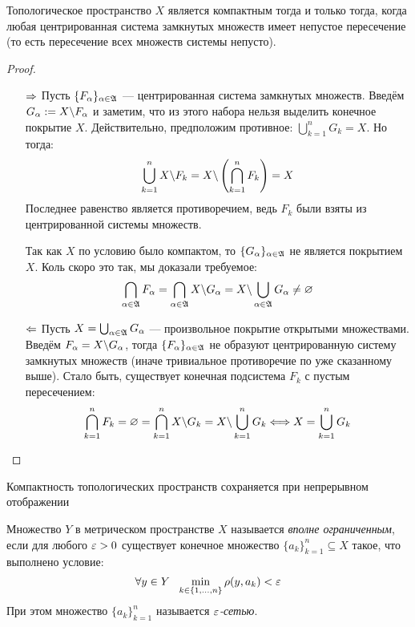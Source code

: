 \begin{theorem}
	Топологическое пространство $X$ является компактным тогда и только тогда, когда любая центрированная система замкнутых множеств имеет непустое пересечение (то есть пересечение всех множеств системы непусто).
\end{theorem}

\begin{proof}~
	\begin{itemize}
		\item[$\Rightarrow$] Пусть $\{F_\alpha\}_{\alpha \in \mathfrak{A}}$ --- центрированная система замкнутых множеств. Введём $G_\alpha := X \backslash F_\alpha$ и заметим, что из этого набора нельзя выделить конечное покрытие $X$. Действительно, предположим противное: $\bigcup_{k = 1}^n G_k = X$. Но тогда:
		\[
			\bigcup_{k = 1}^n X \backslash F_k = X \backslash \left(\bigcap_{k = 1}^n F_k\right) = X
		\]
		Последнее равенство является противоречием, ведь $F_k$ были взяты из центрированной системы множеств.
		
		Так как $X$ по условию было компактом, то $\{G_\alpha\}_{\alpha \in \mathfrak{A}}$ не является покрытием $X$. Коль скоро это так, мы доказали требуемое:
		\[
			\bigcap_{\alpha \in \mathfrak{A}} F_\alpha = \bigcap_{\alpha \in \mathfrak{A}} X \backslash G_\alpha = X \backslash \bigcup_{\alpha \in \mathfrak{A}} G_\alpha \neq \varnothing
		\]
		
		\item[$\Leftarrow$] Пусть $X = \bigcup_{\alpha \in \mathfrak{A}} G_\alpha$ --- произвольное покрытие открытыми множествами. Введём $F_\alpha = X \backslash G_\alpha$, тогда $\{F_\alpha\}_{\alpha \in \mathfrak{A}}$ не образуют центрированную систему замкнутых множеств (иначе тривиальное противоречие по уже сказанному выше). Стало быть, существует конечная подсистема $F_k$ с пустым пересечением:
		\[
			\bigcap_{k = 1}^n F_k = \varnothing = \bigcap_{k = 1}^n X \backslash G_k = X \backslash \bigcup_{k = 1}^n G_k \Longleftrightarrow X = \bigcup_{k = 1}^n G_k
		\]
	\end{itemize}
\end{proof}

\begin{exercise}
	Компактность топологических пространств сохраняется при непрерывном отображении
\end{exercise}

\begin{definition}
	Множество $Y$ в метрическом пространстве $X$ называется \textit{вполне ограниченным}, если для любого $\varepsilon > 0$ существует конечное множество $\{a_k\}_{k = 1}^n \subseteq X$ такое, что выполнено условие:
	\[
		\forall y \in Y\ \ \min_{k \in \{1, \ldots, n\}} \rho(y, a_k) < \varepsilon
	\]
	При этом множество $\{a_k\}_{k = 1}^n$ называется \textit{$\varepsilon$-сетью}.
\end{definition}


